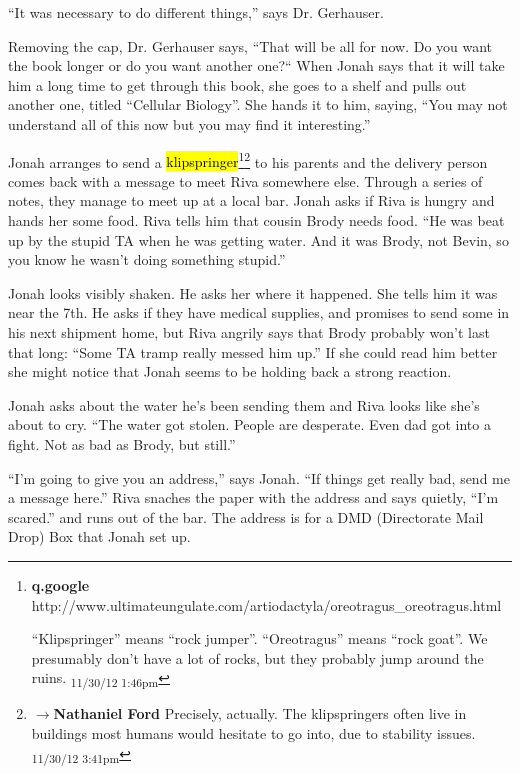 ``It was necessary to do different things,'' says Dr. Gerhauser.



Removing the cap, Dr. Gerhauser says, ``That will be all for now.  Do you want the book longer or do you want another one?``  When Jonah says that it will take him a long time to get through this book, she goes to a shelf and pulls out another one, titled ``Cellular Biology''.  She hands it to him, saying, ``You may not understand all of this now but you may find it interesting.''




Jonah arranges to send a \hl{klipspringer}\footnote{\textbf{q.google }http://www.ultimateungulate.com/artiodactyla/oreotragus\_oreotragus.html

``Klipspringer'' means ``rock jumper''.  ``Oreotragus'' means ``rock goat''.  We presumably don't have a lot of rocks, but they probably jump around the ruins. \textsubscript{11/30/12 1:46pm}}\footnote{$\rightarrow$\textbf{Nathaniel Ford }Precisely, actually. The klipspringers often live in buildings most humans would hesitate to go into, due to stability issues. \textsubscript{11/30/12 3:41pm}} to his parents and the delivery person comes back with a message to meet Riva somewhere else.  Through a series of notes, they manage to meet up at a local bar.  Jonah asks if Riva is hungry and hands her some food.  Riva tells him that cousin Brody needs food. ``He was beat up by the stupid TA when he was getting water.  And it was Brody, not Bevin, so you know he wasn't doing something stupid.''



Jonah looks visibly shaken.  He asks her where it happened.  She tells him it was near the 7th.  He asks if they have medical supplies, and promises to send some in his next shipment home, but Riva angrily says that Brody probably won't last that long: ``Some TA tramp really messed him up.''  If she could read him better she might notice that Jonah seems to be holding back a strong reaction.



Jonah asks about the water he's been sending them and Riva looks like she's about to cry.  ``The water got stolen.  People are desperate.  Even dad got into a fight.  Not as bad as Brody, but still.''



``I'm going to give you an address,'' says Jonah. ``If things get really bad, send me a message here.''  Riva snaches the paper with the address and says quietly, ``I'm scared.'' and runs out of the bar.  The address is for a DMD (Directorate Mail Drop) Box that Jonah set up.



